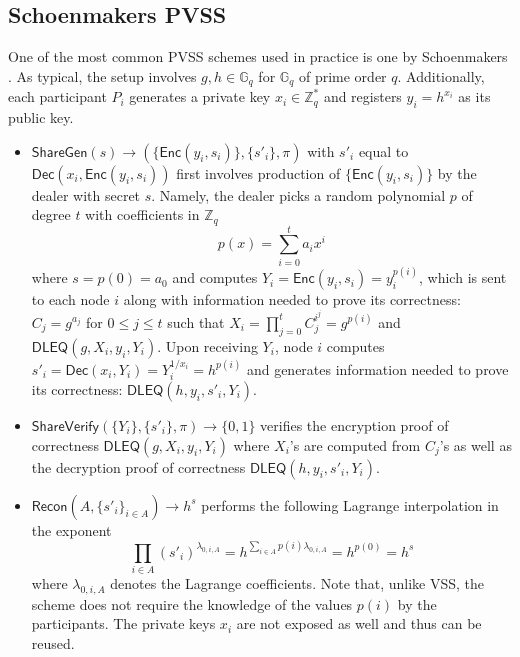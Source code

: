 \documentclass[letterpaper,twocolumn,10pt]{article}
\theoremstyle{definition}
\theoremstyle{remark}
\begin{document}
\iffalse
    PVSS is a secure VSS scheme providing the following additional guarantee:
    \begin{itemize}
        \item Public Verifiability. If the $\mathsf{ShareVerify}$ algorithm returns 1, then the scheme is valid in a publicly verifiable manner with high probability $1 - \mathsf{negl}(\lambda)$.
    \end{itemize}
\fi

\iffalse
\subsection{Schoenmakers PVSS}
\label{appendix:schoenmakersPVSS}
One of the most common PVSS schemes used in practice is one by Schoenmakers \cite{schoenmakers1999simple}. As typical, the setup involves $g, h \in \mathbb{G}_q$ for $\mathbb{G}_q$ of prime order $q$. Additionally, each participant $P_i$ generates a private key $x_i \in \mathbb{Z}^*_q$ and registers $y_i = h^{x_i}$ as its public key.

\begin{itemize}
\item $\mathsf{ShareGen}(s) \rightarrow (\{\mathsf{Enc}(y_i, s_i)\}, \{s'_i\}, \pi)$ with $s'_i$ equal to $\mathsf{Dec}(x_i, \mathsf{Enc}(y_i, s_i))$ first involves production of $\{\mathsf{Enc}(y_i, s_i)\}$ by the dealer with secret $s$. Namely, the dealer picks a random polynomial $p$ of degree $t$ with coefficients in $\mathbb{Z}_q$
\[
p(x) = \sum_{i = 0}^{t} a_i x^i
\]
where $s = p(0) = a_0$ and computes $Y_i = \mathsf{Enc}(y_i, s_i) = y_i^{p(i)}$, which is sent to each node $i$ along with information needed to prove its correctness: $C_j = g^{a_j}$ for $0 \leq j \leq t$ such that $X_i = \prod_{j = 0}^{t} C_j^{i^j} = g^{p(i)}$ and $\mathsf{DLEQ}(g, X_i, y_i, Y_i)$. Upon receiving $Y_i$, node $i$ computes $s'_i = \mathsf{Dec}(x_i, Y_i) = Y_i^{1 / x_i} = h^{p(i)}$ and generates information needed to prove its correctness: $\mathsf{DLEQ}(h, y_i, s'_i, Y_i)$.
\item $\mathsf{ShareVerify}(\{Y_i\}, \{s'_i\}, \pi) \rightarrow \{0, 1\}$ verifies the encryption proof of correctness $\mathsf{DLEQ}(g, X_i, y_i, Y_i)$ where $X_i$'s are computed from $C_j$'s as well as the decryption proof of correctness $\mathsf{DLEQ}(h, y_i, s'_i, Y_i)$.
\item $\mathsf{Recon}(A, \{s'_i\}_{i \in A}) \rightarrow h^s$ performs the following Lagrange interpolation in the exponent
\[
\prod_{i \in A} (s'_i)^{\lambda_{0, i, A}} = h^{\sum_{i \in A} p(i) \lambda_{0, i, A}} = h^{p(0)} = h^s
\]
where $\lambda_{0, i, A}$ denotes the Lagrange coefficients. Note that, unlike VSS, the scheme does not require the knowledge of the values $p(i)$ by the participants. The private keys $x_i$ are not exposed as well and thus can be reused.
\end{itemize}
\end{document}
